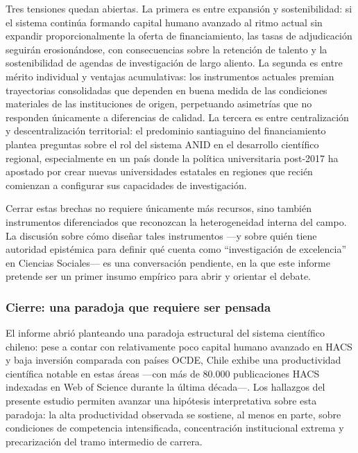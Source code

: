 \documentclass[
  12pt,
  letterpaper,
]{article}
\begin{document}
Tres tensiones quedan abiertas. La primera es entre expansión y
sostenibilidad: si el sistema continúa formando capital humano avanzado
al ritmo actual sin expandir proporcionalmente la oferta de
financiamiento, las tasas de adjudicación seguirán erosionándose, con
consecuencias sobre la retención de talento y la sostenibilidad de
agendas de investigación de largo aliento. La segunda es entre mérito
individual y ventajas acumulativas: los instrumentos actuales premian
trayectorias consolidadas que dependen en buena medida de las
condiciones materiales de las instituciones de origen, perpetuando
asimetrías que no responden únicamente a diferencias de calidad. La
tercera es entre centralización y descentralización territorial: el
predominio santiaguino del financiamiento plantea preguntas sobre el rol
del sistema ANID en el desarrollo científico regional, especialmente en
un país donde la política universitaria post-2017 ha apostado por crear
nuevas universidades estatales en regiones que recién comienzan a
configurar sus capacidades de investigación.

Cerrar estas brechas no requiere únicamente más recursos, sino también
instrumentos diferenciados que reconozcan la heterogeneidad interna del
campo. La discusión sobre cómo diseñar tales instrumentos ---y sobre
quién tiene autoridad epistémica para definir qué cuenta como
``investigación de excelencia'' en Ciencias Sociales--- es una
conversación pendiente, en la que este informe pretende ser un primer
insumo empírico para abrir y orientar el debate.

\subsubsection{Cierre: una paradoja que requiere ser
pensada}\label{cierre-una-paradoja-que-requiere-ser-pensada}

El informe abrió planteando una paradoja estructural del sistema
científico chileno: pese a contar con relativamente poco capital humano
avanzado en HACS y baja inversión comparada con países OCDE, Chile
exhibe una productividad científica notable en estas áreas ---con más de
80.000 publicaciones HACS indexadas en Web of Science durante la última
década---. Los hallazgos del presente estudio permiten avanzar una
hipótesis interpretativa sobre esta paradoja: la alta productividad
observada se sostiene, al menos en parte, sobre condiciones de
competencia intensificada, concentración institucional extrema y
precarización del tramo intermedio de carrera.
\end{document}
